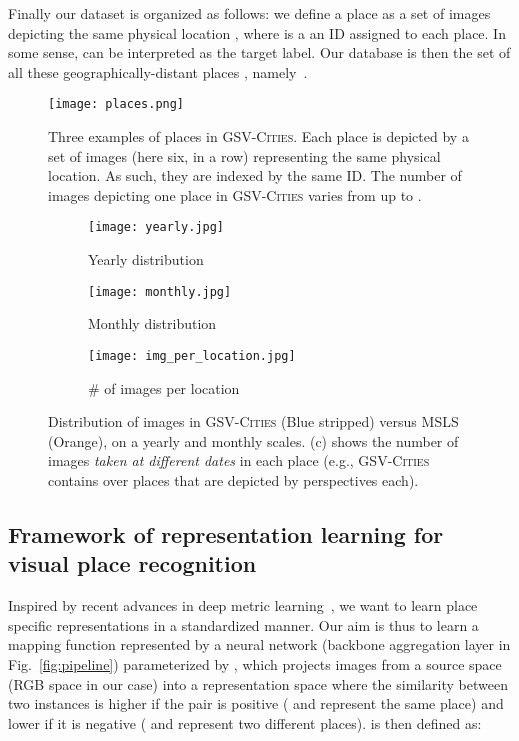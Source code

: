 \documentclass{article}
\begin{document}
Finally our dataset is organized as follows: we define a place  as a set of images  depicting the same physical location , where  is a an ID assigned to each place. In some sense,  can be interpreted as the target label.
Our database  is then the set of all these geographically-distant places , namely~.

\begin{figure*}[t!]
\centering
\texttt{[image: places.png]}
\caption{Three examples of places in \textsc{GSV-Cities}. Each place is depicted by a set of images (here six, in a row) representing the same physical location. As such, they are indexed by the same ID. The number of images depicting one place in \textsc{GSV-Cities} varies from  up to .}
\label{fig:places_sample}
\end{figure*}
\begin{figure*}[t]\begin{subfigure}[Yearly distribution]{0.3\textwidth}
         \centering
         \texttt{[image: yearly.jpg]}
         \caption{Yearly distribution}
         \label{fig:stats2}
\end{subfigure}
     \hfill
\begin{subfigure}[Monthly distribution]{0.3\textwidth}
         \centering
         \texttt{[image: monthly.jpg]}
         \caption{Monthly distribution}
         \label{fig:stats3}
\end{subfigure}
  \hfill
\begin{subfigure}[\# of images per location]{0.3\textwidth}
         \centering
         \texttt{[image: img\_per\_location.jpg]}
         \caption{\# of images per location}
         \label{fig:stats1}
\end{subfigure}
\caption{Distribution of images in \textsc{GSV-Cities} (Blue stripped) versus MSLS (Orange), on a yearly and monthly scales. (c) shows the number of images \textit{taken at different dates} in each place (e.g., \textsc{GSV-Cities} contains over  places that are depicted by  perspectives each).}
\label{fig:2}
\end{figure*}

\subsection{Framework of representation learning for visual place recognition}\label{sec:framework}
Inspired by recent advances in deep metric learning~\cite{wang2019multi}, we want to learn place specific representations in a standardized manner.
Our aim is thus to learn a mapping function  represented by a neural network (backbone  aggregation layer in Fig.~\ref{fig:pipeline}) parameterized by , which projects images  from a source space  (RGB space in our case) into a representation space  where the similarity  between two instances  is higher if the pair is positive ( and  represent the same place) and lower if it is negative ( and  represent two different places).  is then defined as:
\end{document}
